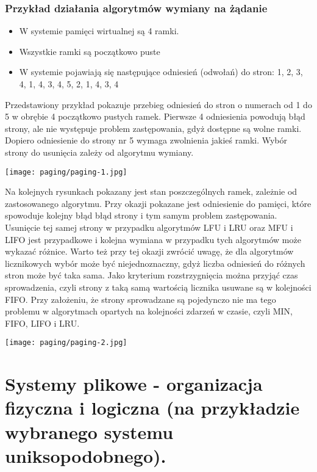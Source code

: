 \documentclass[main.tex]{subfiles}
\begin{document}
    \subsubsection{Przykład działania algorytmów wymiany na żądanie}
    \begin{itemize}
        \item W systemie pamięci wirtualnej są 4 ramki.
        \item Wszystkie ramki są początkowo puste
        \item W systemie pojawiają się następujące odniesień (odwołań) do stron: 1, 2, 3, 4, 1, 4, 3, 4, 5, 2, 1, 4, 3, 4
    \end{itemize}
    Przedstawiony przykład pokazuje przebieg odniesień
    do stron o numerach od 1 do 5 w obrębie 4
    początkowo pustych ramek. Pierwsze 4 odniesienia
    powodują błąd strony, ale nie występuje problem
    zastępowania, gdyż dostępne są wolne ramki.
    Dopiero odniesienie do strony nr 5 wymaga
    zwolnienia jakieś ramki. Wybór strony do usunięcia
    zależy od algorytmu wymiany.

    \begin{center}
        \texttt{[image: paging/paging-1.jpg]}
    \end{center}

    Na kolejnych rysunkach pokazany jest stan poszczególnych ramek,
    zależnie od zastosowanego algorytmu. Przy okazji pokazane jest
    odniesienie do pamięci, które spowoduje kolejny błąd błąd strony i
    tym samym problem zastępowania. Usunięcie tej samej strony w
    przypadku algorytmów LFU i LRU oraz MFU i LIFO jest przypadkowe
    i kolejna wymiana w przypadku tych algorytmów może wykazać
    różnice.
    Warto też przy tej okazji zwrócić uwagę, że dla algorytmów
    licznikowych wybór może być niejednoznaczny, gdyż liczba
    odniesień do różnych stron może być taka sama. Jako kryterium
    rozstrzygnięcia można przyjąć czas sprowadzenia, czyli strony z taką
    samą wartością licznika usuwane są w kolejności FIFO. Przy
    założeniu, że strony sprowadzane są pojedynczo nie ma tego
    problemu w algorytmach opartych na kolejności zdarzeń w czasie,
    czyli MIN, FIFO, LIFO i LRU.

    \begin{center}
        \texttt{[image: paging/paging-2.jpg]}
    \end{center}

    \newpage

    \section{Systemy plikowe - organizacja fizyczna i logiczna (na przykładzie wybranego systemu uniksopodobnego).}
\end{document}
